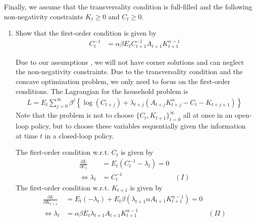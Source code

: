 \documentclass[a4paper]{scrartcl}
\begin{document}
Finally, we assume that the transversality condition is full-filled and the following non-negativity constraints $K_t \geq0$ and $C_t \geq 0$.

\begin{enumerate}
	\item Show that the first-order condition is given by
	\begin{align*}
	C_t^{-1} &= \alpha \beta E_t C_{t+1}^{-1} A_{t+1} K_{t+1}^{\alpha-1}
	\end{align*}
	\begin{solution}
		Due to our assumptions , we will not have corner solutions and can neglect the non-negativity constraints. Due to the transversality condition and the concave optimization problem, we only need to focus on the first-order conditions. 
		The Lagrangian for the household problem is
		\begin{align*}
		L = E_t\sum_{j=0}^{\infty}\beta^j\left\{\log(C_{t+j}) + \lambda_{t+j} \left(A_{t+j}K_{t+j}^\alpha -C_t - K_{t+j+1}\right)\right\}
		\end{align*}
		Note that the problem is not to choose $\{C_t,K_{t+1}\}_{t=0}^\infty$ all at once in an open-loop policy, but to choose these variables sequentially given the information at time $t$ in a closed-loop policy.
		
		The first-order condition w.r.t. $C_t$ is given by
		\begin{align*}
		\frac{\partial L}{\partial C_{t}} &= E_t \left(C_t^{-1}-\lambda_{t}\right) = 0\\
		\Leftrightarrow \lambda_{t} &= C_{t}^{-1} & (I)
		\end{align*}
		The first-order condition w.r.t. $K_{t+1}$ is given by
		\begin{align*}
		\frac{\partial L}{\partial K_{t+1}} &= E_t (-\lambda_{t}) + 
		E_t \beta \left(\lambda_{t+1}\alpha A_{t+1} K_{t+1}^{\alpha-1}\right) = 0\\
		\Leftrightarrow \lambda_{t} &= \alpha\beta E_t \lambda_{t+1}A_{t+1} K_{t+1}^{\alpha-1} & (II)
		\end{align*}
		

\end{solution}
\end{enumerate}
\end{document}
